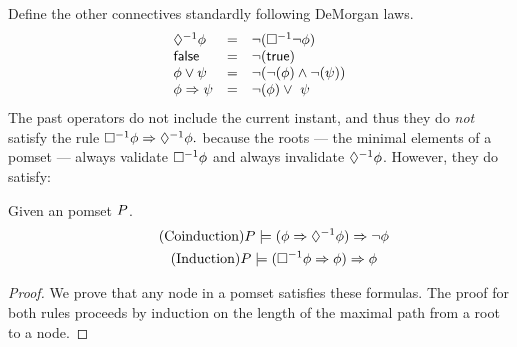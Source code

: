 Define the other connectives standardly following DeMorgan laws.
\begin{displaymath}
\begin{array}{lrl}
\Diamond^{-1}\phi &=& \lnot(\Box^{-1}\lnot\phi) \\
\mathsf{false} &=& \lnot(\mathsf{true}) \\
\phi\lor\psi &=& \lnot(\lnot(\phi)\land\lnot(\psi)) \\
\phi\Rightarrow\psi &=& \lnot(\phi) \lor\ \psi
\end{array}
\end{displaymath}
The past operators do not include the current instant, and thus 
they do \emph{not} satisfy the rule
\begin{math}
  \Box^{-1}\phi\Rightarrow\Diamond^{-1}\phi.
\end{math}
because the roots --- the minimal elements of a pomset --- always validate $ \Box^{-1}\phi$ and always invalidate $\Diamond^{-1}\phi$.  
However, they do satisfy:
\begin{lemma}
Given an pomset $P$.  
\begin{gather*}
  \tag{Coinduction}
  P \models (\phi \Rightarrow\Diamond^{-1}{\phi}) \Rightarrow\lnot \phi
  \\
  \tag{Induction}
  P \models (\Box^{-1}\phi \Rightarrow\phi) \Rightarrow\phi
\end{gather*}
\end{lemma}
\begin{proof}
We prove that any node in a pomset satisfies these formulas.  
The proof for both rules proceeds by induction on the length of the maximal path from a root to a node. 
\end{proof}



